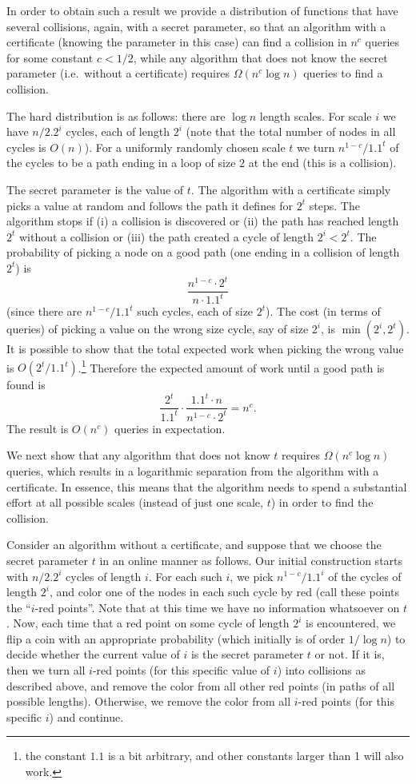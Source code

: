 \documentclass[11pt]{article}
\numberwithin{equation}{section}
\newcommand{\1}{\mathbf{1}}
\begin{document}
In order to obtain such a result 
we provide a distribution of functions that have several collisions, again,  with a secret parameter, so that an algorithm with a certificate (knowing the  parameter in this case) can find a collision in $n^{c}$ queries for some constant $c<1/2$, while any algorithm that does not know the secret parameter (i.e.\ without  a certificate) requires $\Omega(n^{c} \log n)$ queries to find a collision.

The hard distribution is as follows: there are $\log n$ length scales. For scale $i$ we have $n/{2.2^i}$ cycles, each  of length $2^i$ (note that the total number of nodes in all cycles is $O(n)$). For a uniformly randomly chosen scale $t$ we turn $n^{1-c}/{1.1^t}$ of the cycles to be a path ending in a loop of size $2$ at the end (this is a collision). 

The secret parameter is the value of $t$. The algorithm with a certificate simply picks a value at random and follows the path it defines for $2^t$ steps. The algorithm stops if (i)  a collision is discovered or (ii) the path has reached length $2^t$ without a collision  or (iii) the path created a cycle of length $2^i < 2^t$. 
The probability of picking a node on a good path (one ending in  a collision of length $2^t$)  is 
$$\frac{n^{1-c} \cdot 2^t}{n \cdot 1.1^t} $$
(since there are $n^{1-c}/{1.1^t}$ such cycles, each of size $2^t$).
The cost (in terms of queries)  of picking a value on the wrong size cycle, say of size $2^i$, is  $\min(2^i,2^t)$. It is possible to show that the total expected work when picking the wrong value is $O(2^t/1.1^t)$.\footnote{the constant $1.1$ is a bit arbitrary, and other constants larger than 1 will also work.} Therefore the expected amount of work until a good path is found is    
$$\frac{2^t}{1.1^t} \cdot \frac{1.1^t \cdot n }{n^{1-c} \cdot 2^t} = n^{c}.$$ 
The result is $O(n^{c})$ queries in expectation. 

We next show that any algorithm that does not know $t$ requires $\Omega(n^{c} \log n)$ queries, which results in a logarithmic separation from the algorithm with a certificate. In essence, this means that the algorithm needs to spend a substantial effort at all possible scales (instead of just one scale, $t$) in order to find the collision. 

Consider an algorithm without a certificate, and suppose that we choose the secret parameter $t$ in an online manner as follows. Our initial construction starts with $n/{2.2^i}$ cycles of length $i$. For each such $i$, we pick $n^{1-c}/1.1^i$ of the cycles of length $2^i$, and color one of the nodes in each such cycle by red (call these points the ``$i$-red points''. Note that at this time we have no information whatsoever on $t$. Now, each time that a red point on some cycle of length $2^i$ is encountered, we flip a coin with an appropriate probability (which initially is of order $1/\log n$) to decide whether the current value of $i$ is the secret parameter $t$ or not. If it is, then we turn all $i$-red points (for this specific value of $i$) into collisions as described above, and remove the color from all other red points (in paths of all possible lengths). Otherwise, we remove the color from all $i$-red points (for this specific $i$) and continue.
\end{document}
